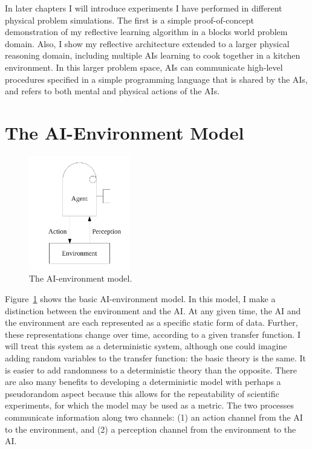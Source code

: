 In later chapters I will introduce experiments I have performed in
different physical problem simulations.  The first is a simple
proof-of-concept demonstration of my reflective learning algorithm in
a blocks world problem domain.  Also, I show my reflective
architecture extended to a larger physical reasoning domain, including
multiple AIs learning to cook together in a kitchen environment.
In this larger problem space, AIs can communicate high-level
procedures specified in a simple programming language that is shared
by the AIs, and refers to both mental and physical actions of the
AIs.

\section{The AI-Environment Model}

\begin{figure}[bth]
  \center
  \includegraphics[height=5cm]{gfx/agent_environment}
  \caption[The AI-environment model]{The AI-environment model.}
  \label{fig:agent_environment}
\end{figure}

Figure~\ref{fig:agent_environment} shows the basic AI-environment
model.  In this model, I make a distinction between the environment
and the AI.  At any given time, the AI and the environment are
each represented as a specific static form of data.  Further, these
representations change over time, according to a given transfer
function.  I will treat this system as a deterministic system,
although one could imagine adding random variables to the transfer
function: the basic theory is the same.  It is easier to add
randomness to a deterministic theory than the opposite.  There are
also many benefits to developing a deterministic model with perhaps a
pseudorandom aspect because this allows for the repeatability of
scientific experiments, for which the model may be used as a metric.
The two processes communicate information along two channels: (1) an
action channel from the AI to the environment, and (2) a perception
channel from the environment to the AI.


